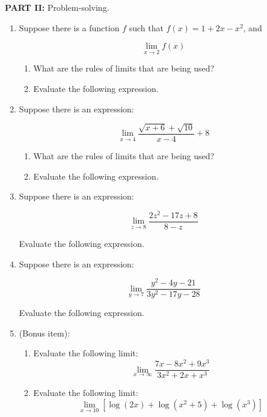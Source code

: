 \documentclass[10pt,paper=letter]{scrartcl}
\begin{document}
 \raggedright \textbf{PART II:} Problem-solving. 

\begin{enumerate}[resume, label=\arabic*.,font=\bfseries]
    \item Suppose there is a function $f$ such that $f(x) =1+2x-x^2$, and
    
    $$\lim_{x \rightarrow 2} {f(x)}$$
    
    \begin{enumerate}
        \item[(a)] What are the rules of limits that are being used? 
        
        \item[(b)] Evaluate the following expression.
    \end{enumerate}
    
    \item Suppose there is an expression:
    
    $$\lim_{x \rightarrow 4} \dfrac{\sqrt{x+6}+\sqrt{10}}{x-4} + 8$$
    
    \begin{enumerate}
        \item[(a)] What are the rules of limits that are being used? 
        
        \item[(b)] Evaluate the following expression.
    \end{enumerate}
    
    \item Suppose there is an expression:
    
    $$\displaystyle \mathop {\lim }\limits_{z \to 8} \frac{{2{z^2} - 17z + 8}}{{8 - z}}$$
    
    Evaluate the following expression.

    
        \item Suppose there is an expression:
    
    $$\displaystyle \mathop {\lim }\limits_{y \to 7} \frac{{{y^2} - 4y - 21}}{{3{y^2} - 17y - 28}}$$
    
     Evaluate the following expression.
    
    \item (Bonus item): 
    
    
    \begin{enumerate}
        \item[(a)] Evaluate the following limit: $$\displaystyle \mathop {\lim }\limits_{x \to \infty} \frac{7x - 8x^2 +9x^3}{{3x^2 +2x + x^3}}$$
    
    \item[(b)] Evaluate the following limit:
    $$\displaystyle \mathop {\lim }\limits_{x \to 10} [ \log(2x) + \log (x^2 +5) + \log(x^3)]$$
    \end{enumerate}
\end{enumerate}
\end{document}
